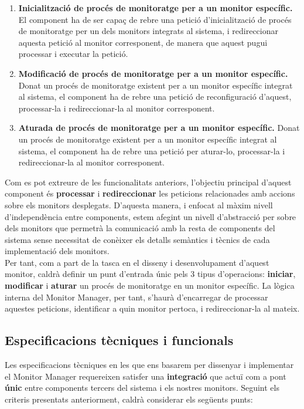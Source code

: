 \begin{enumerate}
\item \textbf{Inicialització de procés de monitoratge per a un monitor específic.} El component ha de ser capaç de rebre una petició d'inicialització de procés de monitoratge per un dels monitors integrats al sistema, i redireccionar aquesta petició al monitor corresponent, de manera que aquest pugui processar i executar la petició.
\item \textbf{Modificació de procés de monitoratge per a un monitor específic.} Donat un procés de monitoratge existent per a un monitor específic integrat al sistema, el component ha de rebre una petició de reconfiguració d'aquest, processar-la i redireccionar-la al monitor corresponent.
\item \textbf{Aturada de procés de monitoratge per a un monitor específic.} Donat un procés de monitoratge existent per a un monitor específic integrat al sistema, el component ha de rebre una petició per aturar-lo, processar-la i redireccionar-la al monitor corresponent.
\end{enumerate}

Com es pot extreure de les funcionalitats anteriors, l'objectiu principal d'aquest component és \textbf{processar} i \textbf{redireccionar} les peticions relacionades amb accions sobre els monitors desplegats. D'aquesta manera, i enfocat al màxim nivell d'independència entre components, estem afegint un nivell d'abstracció per sobre dels monitors que permetrà la comunicació amb la resta de components del sistema sense necessitat de conèixer els detalls semàntics i tècnics de cada implementació dels monitors.\\

Per tant, com a part de la tasca en el disseny i desenvolupament d'aquest monitor, caldrà definir un punt d'entrada únic pels 3 tipus d'operacions: \textbf{iniciar}, \textbf{modificar} i \textbf{aturar} un procés de monitoratge en un monitor específic. La lògica interna del Monitor Manager, per tant, s'haurà d'encarregar de processar aquestes peticions, identificar a quin monitor pertoca, i redireccionar-la al mateix.

\subsection{Especificacions tècniques i funcionals}

Les especificacions tècniques en les que ens basarem per dissenyar i implementar el Monitor Manager requereixen satisfer una \textbf{integració} que actuï com a pont \textbf{únic} entre components tercers del sistema i els nostres monitors. Seguint els criteris presentats anteriorment, caldrà considerar els següents punts:

